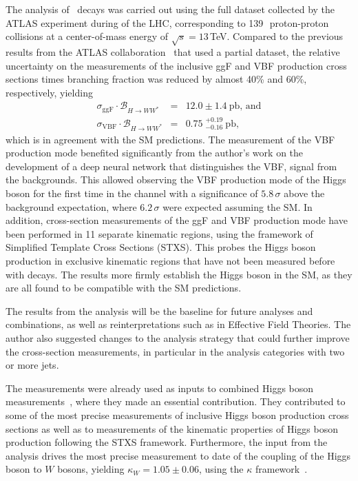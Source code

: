 The analysis of \HWW\ decays was carried out using the full dataset collected by the ATLAS experiment during \RunTwo of the LHC, corresponding to 139\,\ifb\ proton-proton collisions at a center-of-mass energy of $\sqrt{s} = 13\,$TeV. 
Compared to the previous results from the ATLAS collaboration~\cite{HIGG-2016-07} that used a partial \RunTwo dataset, the relative uncertainty on the measurements of the inclusive ggF and VBF production cross sections times branching fraction was reduced by almost 40\% and 60\%, respectively, yielding 
\begin{eqnarray*}
    \sigma_{\mathrm{ggF}} \cdot \mathcal{B}_{H \to WW^{\ast}} &=& 12.0 \pm 1.4~\mathrm{pb}, \,\text{and} \\
    \sigma_{\mathrm{VBF}} \cdot \mathcal{B}_{H \to WW^{\ast}} &=& 0.75\;^{+0.19}_{-0.16}~\mathrm{pb},
\end{eqnarray*}
which is in agreement with the SM predictions.
The measurement of the VBF production mode benefited significantly from the author's work on the development of a deep neural network that distinguishes the VBF, \HWW signal from the backgrounds.
This allowed observing the VBF production mode of the Higgs boson for the first time in the \HWW channel with a significance of $5.8\,\sigma$ above the background expectation, where $6.2\,\sigma$ were expected assuming the SM.
In addition, cross-section measurements of the ggF and VBF production mode have been performed in 11 separate kinematic regions, using the framework of Simplified Template Cross Sections (STXS). This probes the Higgs boson production in exclusive kinematic regions that have not been measured before with \HWW decays.
The results more firmly establish the Higgs boson in the SM, as they are all found to be compatible with the SM predictions.

The results from the \HWW analysis will be the baseline for future analyses and combinations, as well as reinterpretations such as in Effective Field Theories.
The author also suggested changes to the analysis strategy that could further improve the \HWW cross-section measurements, in particular in the analysis categories with two or more jets.

The measurements were already used as inputs to combined Higgs boson measurements~\cite{NaturePaper}, where they made an essential contribution. 
They contributed to some of the most precise measurements of inclusive Higgs boson production cross sections as well as to measurements of the kinematic properties of Higgs boson production following the STXS framework.
Furthermore, the input from the \HWW analysis drives the most precise measurement to date of the coupling of the Higgs boson to $W$ bosons, yielding $\kappa_{W} = 1.05 \pm 0.06$, using the $\kappa$ framework~\cite{LHCHandbookV3}.

